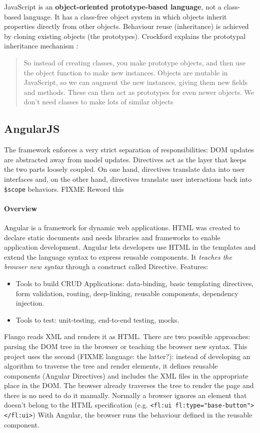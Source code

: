 JavaScript is an \textbf{object-oriented prototype-based language}, not a class-based language.
It has a class-free object system in which objects inherit properties directly from other objects.
Behaviour reuse (inheritance) is achieved by cloning existing objects (the prototypes).
Crockford explains the prototypal inheritance mechanism \cite{Crockford:proto}:
\begin{quote}
So instead of creating classes, you make prototype objects, and then use the object function to make new instances. Objects are mutable in JavaScript, so we can augment the new instances, giving them new fields and methods. These can then act as prototypes for even newer objects. We don't need classes to make lots of similar objects
\end{quote}

\subsection{AngularJS}
The framework enforces a very strict separation of responsibilities: \ac{DOM} updates are abstracted away from model updates. 
Directives act as the layer that keeps the two parts loosely coupled.
On one hand, directives translate data into user interfaces and, on the other hand, directives translate user interactions back into \texttt{\$scope} behaviors. FIXME Reword this

\paragraph{Overview} Angular is a framework for dynamic web applications.
\ac{HTML} was created to declare static documents and needs libraries and frameworks to enable application development.
Angular lets developers use \ac{HTML} in the templates and extend the language syntax to express reusable components.
It \textit{teaches the browser new syntax} through a construct called Directive.
Features:
\begin{itemize}
    \item Tools to build \ac{CRUD} Applications: data-binding, basic templating directives, form validation, routing, deep-linking, reusable components, dependency injection.
    \item Tools to test: unit-testing, end-to-end testing, mocks.
\end{itemize}

Flango \cm reads \ac{XML} and renders it as \ac{HTML}.
There are two possible approaches: parsing the \ac{DOM} tree in the browser or teaching the browser new syntax.
This project uses the second (FIXME language: the latter?): instead of developing an algorithm to traverse the tree and render elements, it defines reusable components (Angular Directives) and includes the \ac{XML} files in the appropriate place in the \ac{DOM}. 
The browser already traverses the tree to render the page and there is no need to do it manually.
Normally a browser ignores an element that doesn't belong to the \ac{HTML} specification (e.g. \lstinline$<fl:ui fl:type="base-button"></fl:ui>$)
With Angular, the browser runs the behaviour defined in the reusable component.

